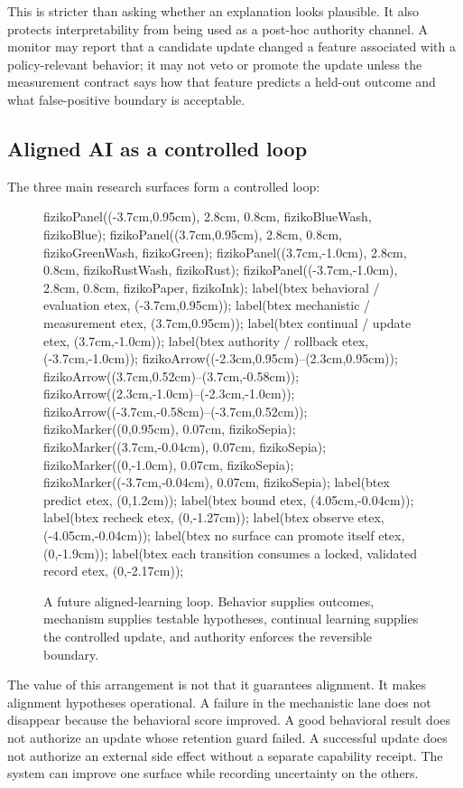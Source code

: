 \documentclass[11pt,twoside]{article}
\begin{document}
  This is stricter than asking whether an explanation looks plausible. It also protects interpretability from being used as a post-hoc authority channel. A monitor may report that a candidate update changed a feature associated with a policy-relevant behavior; it may not veto or promote the update unless the measurement contract says how that feature predicts a held-out outcome and what false-positive boundary is acceptable.

\subsection{Aligned AI as a controlled loop}

  The three main research surfaces form a controlled loop:

\begin{figure}[t]
\centering
\mpfig
  fizikoPanel((-3.7cm,0.95cm), 2.8cm, 0.8cm, fizikoBlueWash, fizikoBlue);
  fizikoPanel((3.7cm,0.95cm), 2.8cm, 0.8cm, fizikoGreenWash, fizikoGreen);
  fizikoPanel((3.7cm,-1.0cm), 2.8cm, 0.8cm, fizikoRustWash, fizikoRust);
  fizikoPanel((-3.7cm,-1.0cm), 2.8cm, 0.8cm, fizikoPaper, fizikoInk);
  label(btex \scriptsize behavioral / evaluation etex, (-3.7cm,0.95cm));
  label(btex \scriptsize mechanistic / measurement etex, (3.7cm,0.95cm));
  label(btex \scriptsize continual / update etex, (3.7cm,-1.0cm));
  label(btex \scriptsize authority / rollback etex, (-3.7cm,-1.0cm));
  fizikoArrow((-2.3cm,0.95cm)--(2.3cm,0.95cm));
  fizikoArrow((3.7cm,0.52cm)--(3.7cm,-0.58cm));
  fizikoArrow((2.3cm,-1.0cm)--(-2.3cm,-1.0cm));
  fizikoArrow((-3.7cm,-0.58cm)--(-3.7cm,0.52cm));
  fizikoMarker((0,0.95cm), 0.07cm, fizikoSepia);
  fizikoMarker((3.7cm,-0.04cm), 0.07cm, fizikoSepia);
  fizikoMarker((0,-1.0cm), 0.07cm, fizikoSepia);
  fizikoMarker((-3.7cm,-0.04cm), 0.07cm, fizikoSepia);
  label(btex \scriptsize predict etex, (0,1.2cm));
  label(btex \scriptsize bound etex, (4.05cm,-0.04cm));
  label(btex \scriptsize recheck etex, (0,-1.27cm));
  label(btex \scriptsize observe etex, (-4.05cm,-0.04cm));
  label(btex \scriptsize no surface can promote itself etex, (0,-1.9cm));
  label(btex \scriptsize each transition consumes a locked, validated record etex, (0,-2.17cm));
\endmpfig
\caption{A future aligned-learning loop. Behavior supplies outcomes, mechanism supplies testable hypotheses, continual learning supplies the controlled update, and authority enforces the reversible boundary.}
\label{fig:alignedloop}
\end{figure}

  The value of this arrangement is not that it guarantees alignment. It makes alignment hypotheses operational. A failure in the mechanistic lane does not disappear because the behavioral score improved. A good behavioral result does not authorize an update whose retention guard failed. A successful update does not authorize an external side effect without a separate capability receipt. The system can improve one surface while recording uncertainty on the others.
\end{document}

